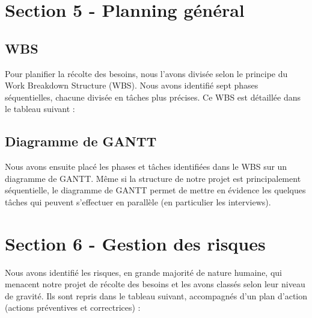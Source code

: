 \documentclass[a4paper,12pt]{article}
\begin{document}

\section{Section 5 - Planning général}

\subsection{WBS}

Pour planifier la récolte des besoins, nous l'avons divisée selon le principe du Work Breakdown Structure (WBS). Nous avons identifié sept phases séquentielles, chacune divisée en tâches plus précises. Ce WBS est détaillée dans le tableau suivant :

\subsection{Diagramme de GANTT}

Nous avons ensuite placé les phases et tâches identifiées dans le WBS sur un diagramme de GANTT. Même si la structure de notre projet est principalement séquentielle, le diagramme de GANTT permet de mettre en évidence les quelques tâches qui peuvent s'effectuer en parallèle (en particulier les interviews).

\section{Section 6 - Gestion des risques}

Nous avons identifié les risques, en grande majorité de nature humaine, qui menacent notre projet de récolte des besoins et les avons classés selon leur niveau de gravité. Ils sont repris dans le tableau suivant, accompagnés d'un plan d'action (actions préventives et correctrices) :
\end{document}
